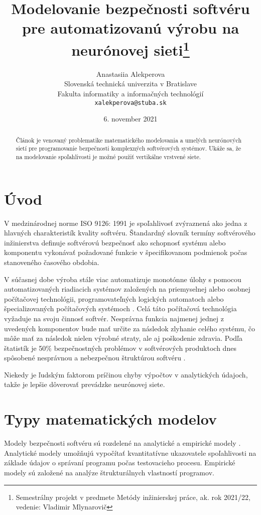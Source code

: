 \documentclass[10pt,twoside,slovak,a4paper]{article}
\title{Modelovanie bezpečnosti softvéru pre automatizovanú výrobu na neurónovej sieti\thanks{Semestrálny projekt v predmete Metódy inžinierskej práce, ak. rok 2021/22, vedenie: Vladimir Mlynarovič}} %
\author{Anastasiia Alekperova\\[2pt]
	{\small Slovenská technická univerzita v Bratislave}\\
	{\small Fakulta informatiky a informačných technológií}\\
	{\small \texttt{xalekperova@stuba.sk}}
	}
\date{\small 6. november 2021}
\begin{document}
\maketitle

\begin{abstract}
Článok je venovaný problematike matematického modelovania a umelých neurónových sietí pre programovanie bezpečnosti komplexných softvérových systémov. Ukáže sa, že na modelovanie spoľahlivosti je možné použiť vertikálne vrstvené siete.
\end{abstract}



\section{Úvod}
V medzinárodnej norme ISO 9126: 1991 \cite{alrawashdeh2013evaluating} je spoľahlivosť zvýraznená ako jedna z hlavných charakteristík kvality softvéru. Štandardný slovník \cite{branstad1984software} termíny softvérového inžinierstva definuje softvérovú bezpečnosť ako schopnosť systému alebo komponentu vykonávať požadované funkcie v špecifikovanom
podmienok počas stanoveného časového obdobia.

V súčasnej dobe výroba stále viac automatizuje monotónne úlohy s pomocou automatizovaných riadiacich systémov založených na priemyselnej alebo osobnej počítačovej technológii, programovateľných logických automatoch alebo špecializovaných počítačových systémoch \cite{kabak1984reability}.
Celá táto počítačová technológia vyžaduje na svoju činnosť softvér. Nesprávna funkcia najmenej jednej z uvedených komponentov bude mať určite za následok zlyhanie celého systému, čo môže mať za následok nielen výrobné straty, ale aj poškodenie zdravia. Podľa štatistík je 50\% bezpečnostných problémov v softvérových produktoch dnes spôsobené nesprávnou a nebezpečnou štruktúrou softvéru \cite{polupudnikov2018istruments}.

Niekedy je ľudským faktorom príčinou chyby výpočtov v analytických údajoch, takže je lepšie dôverovať prevádzke neurónovej siete.


\section{Typy matematických modelov} \label{typy}
Modely bezpečnosti softvéru sú rozdelené na analytické a empirické modely \cite{blagodatskych2005standart}. Analytické modely umožňujú vypočítať kvantitatívne ukazovatele spoľahlivosti na základe údajov o správaní programu počas testovacieho procesu. Empirické modely sú založené na analýze štrukturálnych vlastností programov.
\end{document}
